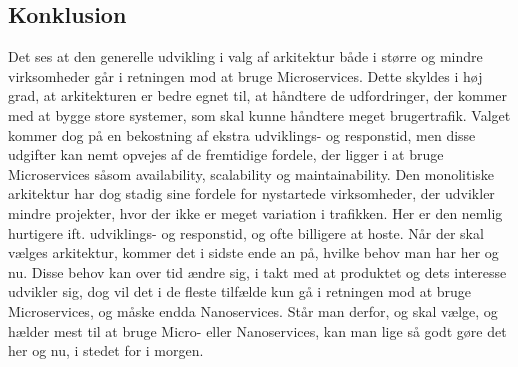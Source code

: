 \documentclass{article}
\begin{document}
\begin{flushleft}
\section*{Konklusion}
Det ses at den generelle udvikling i valg af arkitektur både i større og mindre virksomheder går i retningen mod at bruge Microservices. Dette skyldes i høj grad, at arkitekturen er bedre egnet til, at håndtere de udfordringer, der kommer med at bygge store systemer, som skal kunne håndtere meget brugertrafik. Valget kommer dog på en bekostning af ekstra udviklings- og responstid, men disse udgifter kan nemt opvejes af de fremtidige fordele, der ligger i at bruge Microservices såsom availability, scalability og maintainability. Den monolitiske arkitektur har dog stadig sine fordele for nystartede virksomheder, der udvikler mindre projekter, hvor der ikke er meget variation i trafikken. Her er den nemlig hurtigere ift. udviklings- og responstid, og ofte billigere at hoste. Når der skal vælges arkitektur, kommer det i sidste ende an på, hvilke behov man har her og nu. Disse behov kan over tid ændre sig, i takt med at produktet og dets interesse udvikler sig, dog vil det i de fleste tilfælde kun gå i retningen mod at bruge Microservices, og måske endda Nanoservices. Står man derfor, og skal vælge, og hælder mest til at bruge Micro- eller Nanoservices, kan man lige så godt gøre det her og nu, i stedet for i morgen.\linebreak



\end{flushleft}
\end{document}
